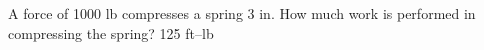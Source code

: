 {A force of 1000 lb compresses a spring 3 in. How much work is performed in compressing the spring?}
{125 ft--lb
}
